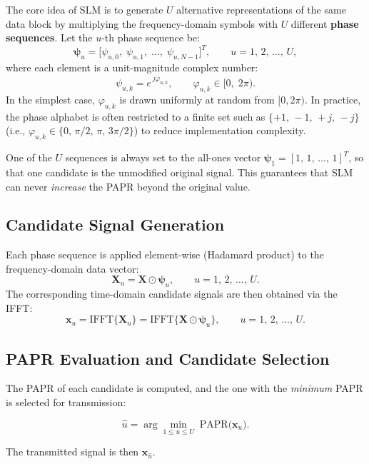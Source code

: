 The core idea of SLM is to generate $U$ alternative representations of the same data block by multiplying the frequency-domain symbols with $U$ different \textbf{phase sequences}.  Let the $u$-th phase sequence be:
\begin{equation*}
    \bm{\psi}_u = \bigl[\psi_{u,0},\;\psi_{u,1},\;\dots,\;\psi_{u,N-1}\bigr]^T,
    \qquad u = 1,\,2,\,\dots,\,U,
\end{equation*}
where each element is a unit-magnitude complex number:
\begin{equation*}
    \psi_{u,k} = e^{\,j\varphi_{u,k}},
    \qquad \varphi_{u,k} \in [0,\;2\pi).
\end{equation*}
In the simplest case, $\varphi_{u,k}$ is drawn uniformly at random from $[0,2\pi)$.  In practice, the phase alphabet is often restricted to a finite set such as $\{+1,\,-1,\,+j,\,-j\}$ (i.e., $\varphi_{u,k} \in \{0,\, \pi/2,\, \pi,\, 3\pi/2\}$) to reduce implementation complexity.

\begin{keyinsight}
    One of the $U$ sequences is always set to the all-ones vector $\bm{\psi}_1 = [1,\,1,\,\dots,\,1]^T$, so that one candidate is the unmodified original signal.  This guarantees that SLM can never \emph{increase} the PAPR beyond the original value.
\end{keyinsight}

\subsection{Candidate Signal Generation}

Each phase sequence is applied element-wise (Hadamard product) to the frequency-domain data vector:
\begin{equation*}
    \bm{X}_u = \bm{X} \odot \bm{\psi}_u,
    \qquad u = 1,\,2,\,\dots,\,U.
\end{equation*}
The corresponding time-domain candidate signals are then obtained via the IFFT:
\begin{equation*}
    \bm{x}_u = \mathrm{IFFT}\{\bm{X}_u\}
             = \mathrm{IFFT}\{\bm{X} \odot \bm{\psi}_u\},
    \qquad u = 1,\,2,\,\dots,\,U.
\end{equation*}

\subsection{PAPR Evaluation and Candidate Selection}

The PAPR of each candidate is computed, and the one with the \emph{minimum} PAPR is selected for transmission:
\begin{keyresult}
\begin{equation}
    \hat{u} = \arg\min_{1 \le u \le U}\;
    \mathrm{PAPR}\bigl(\bm{x}_u\bigr).
\end{equation}
\end{keyresult}
The transmitted signal is then $\bm{x}_{\hat{u}}$.

